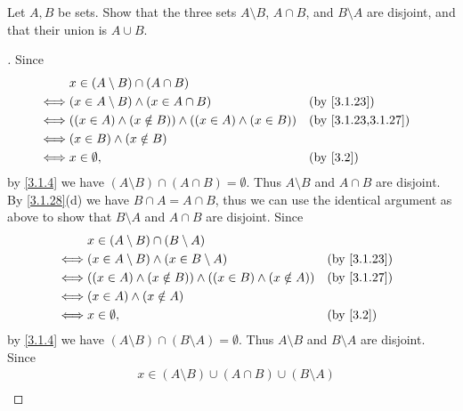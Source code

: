 \begin{ex}\label{ex:3.1.10}
  Let \(A, B\) be sets.
  Show that the three sets \(A \setminus B\), \(A \cap B\), and \(B \setminus A\) are disjoint, and that their union is \(A \cup B\).
\end{ex}

\begin{proof}[]
  Since
  \begin{align*}
         & x \in (A \setminus B) \cap (A \cap B)                                                    \\
    \iff & (x \in A \setminus B) \land (x \in A \cap B)                     &  & \by{3.1.23}        \\
    \iff & ((x \in A) \land (x \notin B)) \land ((x \in A) \land (x \in B)) &  & \by{3.1.23,3.1.27} \\
    \iff & (x \in B) \land (x \notin B)                                                             \\
    \iff & x \in \emptyset,                                                 &  & \by{3.2}
  \end{align*}
  by \cref{3.1.4} we have \((A \setminus B) \cap (A \cap B) = \emptyset\).
  Thus \(A \setminus B\) and \(A \cap B\) are disjoint.
  By \cref{3.1.28}(d) we have \(B \cap A = A \cap B\), thus we can use the identical argument as above to show that \(B \setminus A\) and \(A \cap B\) are disjoint.
  Since
  \begin{align*}
         & x \in (A \setminus B) \cap (B \setminus A)                                           \\
    \iff & (x \in A \setminus B) \land (x \in B \setminus A)                   &  & \by{3.1.23} \\
    \iff & ((x \in A) \land (x \notin B)) \land ((x \in B) \land (x \notin A)) &  & \by{3.1.27} \\
    \iff & (x \in A) \land (x \notin A)                                                         \\
    \iff & x \in \emptyset,                                                    &  & \by{3.2}
  \end{align*}
  by \cref{3.1.4} we have \((A \setminus B) \cap (B \setminus A) = \emptyset\).
  Thus \(A \setminus B\) and \(B \setminus A\) are disjoint.
  Since
  \begin{align*}
         & x \in (A \setminus B) \cup (A \cap B) \cup (B \setminus A)                                                           \\

\end{align*}
\end{proof}
